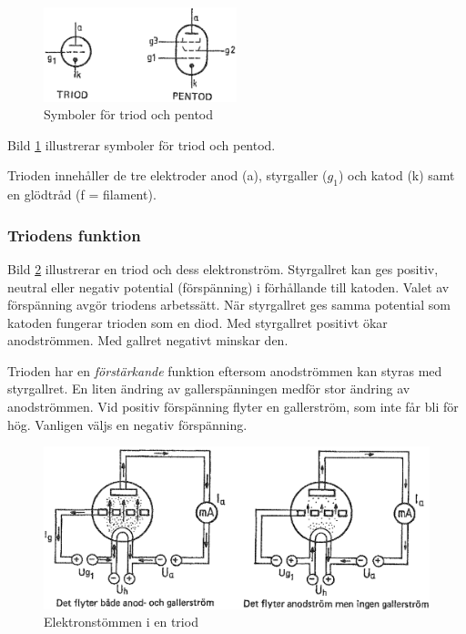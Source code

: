 \begin{figure}[ht]
\begin{center}
  \includegraphics[width=0.5\textwidth]{images/cropped_pdfs/bild_2_2-30.pdf}
  \caption{Symboler för triod och pentod}
  \label{fig:BildII2-30}
\end{center}
\end{figure}

Bild \ref{fig:BildII2-30} illustrerar symboler för triod och pentod.

Trioden innehåller de tre elektroder anod (a), styrgaller (\(g_1\)) och katod
(k) samt en glödtråd (f = filament).

\subsubsection{Triodens funktion}

Bild \ref{fig:BildII2-31} illustrerar en triod och dess elektronström.
Styrgallret kan ges positiv, neutral eller negativ potential (förspänning) i
förhållande till katoden.
Valet av förspänning avgör triodens arbetssätt.
När styrgallret ges samma potential som katoden fungerar trioden som en diod.
Med styrgallret positivt ökar anodströmmen.
Med gallret negativt minskar den.

Trioden har en \emph{förstärkande} funktion eftersom anodströmmen kan styras med
styrgallret. En liten ändring av gallerspänningen medför stor ändring av anodströmmen.
Vid positiv förspänning flyter en gallerström, som inte får bli för hög.
Vanligen väljs en negativ förspänning.

\begin{figure}[ht]
	\includegraphics[width=\textwidth]{images/cropped_pdfs/bild_2_2-31.pdf}
	\caption{Elektronstömmen i en triod}
	\label{fig:BildII2-31}
\end{figure}

